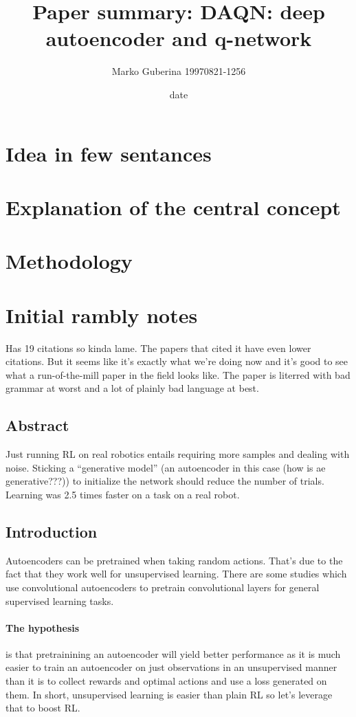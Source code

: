 \documentclass{article}
\title{Paper summary: DAQN: deep autoencoder and q-network}
\date{date}
\author{Marko Guberina 19970821-1256}
\begin{document}
\maketitle




\section{Idea in few sentances}


\section{Explanation of the central concept}




\section{Methodology}


\section{Initial rambly notes}
Has 19 citations so kinda lame. The papers that cited it have even lower citations.
But it seems like it's exactly what we're doing now and
it's good to see what a run-of-the-mill paper in the field looks like.
The paper is literred with bad grammar at worst and
a lot of plainly bad language at best.


\subsection{Abstract}
Just running RL on real robotics entails
requiring more samples and dealing with noise.
Sticking a ``generative model'' (an autoencoder in this case (how is ae generative???)) to initialize the network
should reduce the number of trials.
Learning was 2.5 times faster on a task on a real robot.

\subsection{Introduction}
Autoencoders can be pretrained when taking random actions.
That's due to the fact that they work well for unsupervised learning.
There are some studies which use convolutional autoencoders 
to pretrain convolutional layers for general supervised learning tasks.
\paragraph{The hypothesis} is that pretrainining an autoencoder will yield better
performance as it is much easier to train an autoencoder on just observations
in an unsupervised manner than it is to collect rewards and optimal actions
and use a loss generated on them.
In short, unsupervised learning is easier than plain RL so let's 
leverage that to boost RL.
\end{document}
